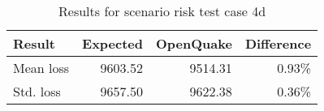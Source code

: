 \begin{table}[htbp]

\centering
\begin{tabular}{ l r r r }

\hline
\rowcolor{anti-flashwhite}
\bf{Result} & \bf{Expected} & \bf{OpenQuake} & \bf{Difference}\\
\hline
Mean loss & 9603.52 & 9514.31 & 0.93\% \\
Std. loss & 9657.50 & 9622.38 & 0.36\% \\
\hline
\end{tabular}

\caption{Results for scenario risk test case 4d}
\label{tab:result-scenario-risk-4d}
\end{table}